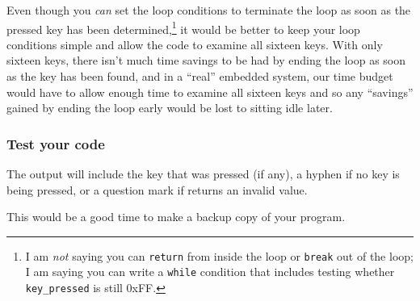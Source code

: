 Even though you \textit{can} set the loop conditions to terminate the loop as soon as the pressed key has been determined,\footnote{
    I am \textit{not} saying you can \lstinline{return} from inside the loop or \lstinline{break} out of the loop;
    I am saying you can write a \lstinline{while} condition that includes testing whether \lstinline{key_pressed} is still 0xFF.
} it would be better to keep your loop conditions simple and allow the code to examine all sixteen keys.
With only sixteen keys, there isn't much time savings to be had by ending the loop as soon as the key has been found,
and in a ``real'' embedded system, our time budget would have to allow enough time to examine all sixteen keys and so any ``savings'' gained by ending the loop early would be lost to sitting idle later.

\subsubsection*{Test your code}

\begin{description}
\end{description}
The output will include the key that was pressed (if any), a hyphen if no key is being pressed, or a question mark if  returns an invalid value.

\vspace{1cm}

This would be a good time to make a backup copy of your program.


